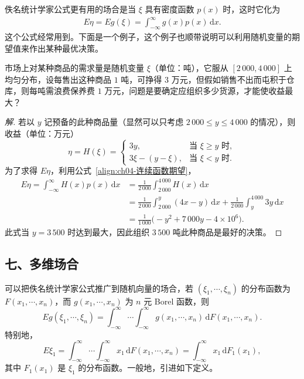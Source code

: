 \documentclass[../../main.tex]{subfiles}
\begin{document}
佚名统计学家公式更有用的场合是当 $\xi$ 具有密度函数 $p(x)$ 时，这时它化为
\begin{align}
E\eta=Eg(\xi)=\int_{-\infty}^{\infty} g(x)p(x)\,\mathrm{d}x.\label{align:ch04-连续函数期望}
\end{align}
这个公式经常用到。下面是一个例子，这个例子也顺带说明可以利用随机变量的期望值来作出某种最优决策。

\begin{example}[最优存货量]\label{example:ch04-最优存货量}
市场上对某种商品的需求量是随机变量 $\xi$（单位：吨），它服从 $[2\,000,4\,000]$ 上均匀分布，设每售出这种商品 $1$ 吨，可挣得 $3$ 万元，但假如销售不出而屯积于仓库，则每吨需浪费保养费 $1$ 万元，问题是要确定应组织多少货源，才能使收益最大？
\end{example}

\begin{proof}[解]
若以 $y$ 记预备的此种商品量（显然可以只考虑 $2\,000\leqslant y\leqslant 4\,000$ 的情况），则收益（单位：万元）
\[
\eta=H(\xi)=\begin{cases}
3y,&\text{当 }\xi\geqslant y\text{ 时},\\
3\xi-(y-\xi),&\text{当 }\xi<y\text{ 时}.
\end{cases}
\]
为了求得 $E\eta$，利用公式~\eqref{align:ch04-连续函数期望}，
\begin{align*}
E\eta=\int_{-\infty}^{\infty}H(x)p(x)\,\mathrm{d}x
&=\frac{1}{2\,000}\int_{2\,000}^{4\,000}H(x)\,\mathrm{d}x\\
&=\frac{1}{2\,000}\int_{2\,000}^{y}(4x-y)\,\mathrm{d}x+\frac{1}{2\,000}\int_y^{4\,000}3y\,\mathrm{d}x\\
&=\frac{1}{1\,000}\bigl(-y^2+7\,000y-4\times 10^6\bigr).
\end{align*}
此式当 $y=3\,500$ 时达到最大，因此组织 $3\,500$ 吨此种商品是最好的决策。
\end{proof}

\subsection*{七、多维场合}

可以把佚名统计学家公式推广到随机向量的场合，若 $(\xi_1,\cdots,\xi_n)$ 的分布函数为 $F(x_1,\cdots,x_n)$，而 $g(x_1,\cdots,x_n)$ 为 $n$ 元 Borel 函数，则
\[
Eg(\xi_1,\cdots,\xi_n)=\int_{-\infty}^{\infty}\cdots\int_{-\infty}^{\infty}g(x_1,\cdots,x_n)\,\mathrm{d}F(x_1,\cdots,x_n).
\]
特别地，
\[
E\xi_1=\int_{-\infty}^{\infty}\cdots\int_{-\infty}^{\infty}x_1\,\mathrm{d}F(x_1,\cdots,x_n)
=\int_{-\infty}^{\infty}x_1\,\mathrm{d}F_1(x_1),
\]
其中 $F_1(x_1)$ 是 $\xi_1$ 的分布函数。一般地，引进如下定义。
\end{document}
